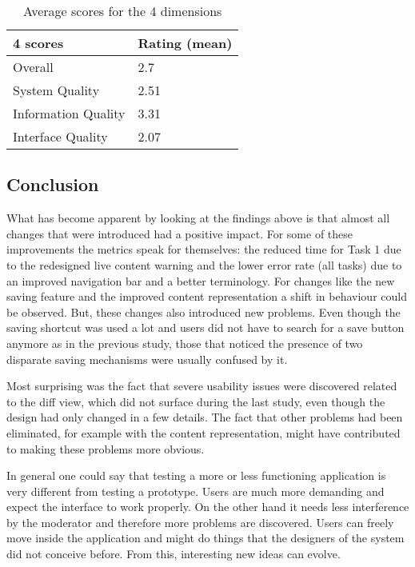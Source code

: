 \begin{table}[h!]
\centering
\begin{tabular}{|l|l|}
\hline
\rowcolor[HTML]{EFEFEF}
{\bf 4 scores} & {\bf Rating (mean)} \\ \hline
Overall & 2.7 \\ \hline
System Quality & 2.51 \\ \hline
Information Quality & 3.31 \\ \hline
Interface Quality & 2.07 \\ \hline
\end{tabular}
\caption{Average scores for the 4 dimensions}
\label{table:post-study-scores}
\end{table}

\subsection{Conclusion}
What has become apparent by looking at the findings above is that almost all changes that were introduced had a positive impact. For some of these improvements the metrics speak for themselves: the reduced time for Task 1 due to the redesigned live content warning and the lower error rate (all tasks) due to an improved navigation bar and a better terminology. For changes like the new saving feature and the improved content representation a shift in behaviour could be observed. But, these changes also introduced new problems. Even though the saving shortcut was used a lot and users did not have to search for a save button anymore as in the previous study, those that noticed the presence of two disparate saving mechanisms were usually confused by it.

Most surprising was the fact that severe usability issues were discovered related to the diff view, which did not surface during the last study, even though the design had only changed in a few details. The fact that other problems had been eliminated, for example with the content representation, might have contributed to making these problems more obvious.

In general one could say that testing a more or less functioning application is very different from testing a prototype. Users are much more demanding and expect the interface to work properly. On the other hand it needs less interference by the moderator and therefore more problems are discovered. Users can freely move inside the application and might do things that the designers of the system did not conceive before. From this, interesting new ideas can evolve.

